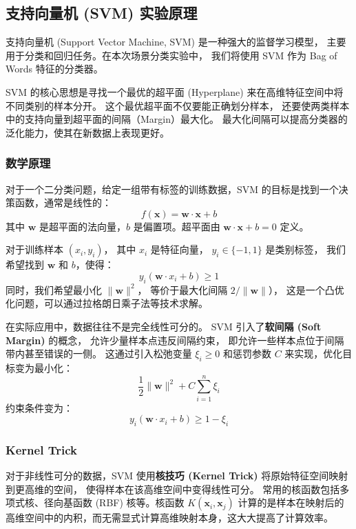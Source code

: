 \subsection{支持向量机 (SVM) 实验原理}

支持向量机 (Support Vector Machine, SVM) 是一种强大的监督学习模型，
主要用于分类和回归任务。在本次场景分类实验中，
我们将使用 SVM 作为 Bag of Words 特征的分类器。

SVM 的核心思想是寻找一个最优的超平面 (Hyperplane) 来在高维特征空间中将不同类别的样本分开。
这个最优超平面不仅要能正确划分样本，
还要使两类样本中的支持向量到超平面的间隔（Margin）最大化。
最大化间隔可以提高分类器的泛化能力，使其在新数据上表现更好。

\subsubsection{数学原理}

对于一个二分类问题，给定一组带有标签的训练数据，SVM 的目标是找到一个决策函数，通常是线性的：
    \[ f(\mathbf{x}) = \mathbf{w} \cdot \mathbf{x} + b \]
其中 \(\mathbf{w}\) 是超平面的法向量，\(b\) 是偏置项。超平面由 \(\mathbf{w} \cdot \mathbf{x} + b = 0\) 定义。

对于训练样本 \((x_i, y_i)\)，
其中 \(x_i\) 是特征向量，
\(y_i \in \{-1, 1\}\) 是类别标签，
我们希望找到 \(\mathbf{w}\) 和 \(b\)，使得：
    \[ y_i (\mathbf{w} \cdot x_i + b) \ge 1 \]
同时，我们希望最小化 \(\|\mathbf{w}\|^2\)，
等价于最大化间隔 \(2/\|\mathbf{w}\|\)），
这是一个凸优化问题，可以通过拉格朗日乘子法等技术求解。

在实际应用中，数据往往不是完全线性可分的。
SVM 引入了\textbf{软间隔 (Soft Margin)} 的概念，
允许少量样本点违反间隔约束，
即允许一些样本点位于间隔带内甚至错误的一侧。
这通过引入松弛变量 \(\xi_i \ge 0\) 和惩罚参数 \(C\) 来实现，优化目标变为最小化：
    \[ \frac{1}{2}\|\mathbf{w}\|^2 + C \sum_{i=1}^n \xi_i \]
约束条件变为：
\[ y_i (\mathbf{w} \cdot x_i + b) \ge 1 - \xi_i \]

\subsubsection{Kernel Trick}

对于非线性可分的数据，SVM 使用\textbf{核技巧 (Kernel Trick)} 
将原始特征空间映射到更高维的空间，
使得样本在该高维空间中变得线性可分。
常用的核函数包括多项式核、径向基函数 (RBF) 核等。核函数 \(K(\mathbf{x}_i, \mathbf{x}_j)\) 计算的是样本在映射后的高维空间中的内积，而无需显式计算高维映射本身，这大大提高了计算效率。

